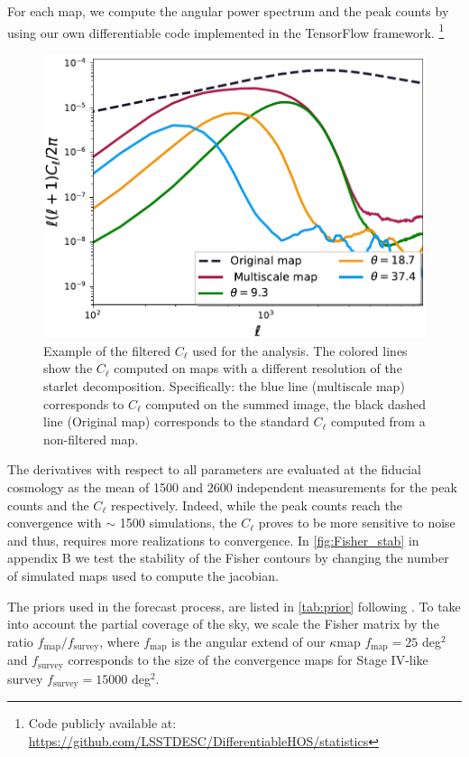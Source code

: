 \documentclass{aa}
\begin{document}
For each map, we compute the angular power spectrum and the peak counts by using our own differentiable code implemented in the TensorFlow framework. \footnote{
Code publicly available at: \\ \href{https://github.com/LSSTDESC/DifferentiableHOS/tree/main/DifferentiableHOS/statistics}{https://github.com/LSSTDESC/DifferentiableHOS/statistics}  }
\begin{figure}
    \centering
    \includegraphics[width=\columnwidth]{paper/figures/window.pdf}
    \caption{Example of the filtered $C_{\ell}$ used for the analysis. The colored lines show the $C_{\ell}$ computed on maps with a different resolution of the starlet decomposition. Specifically: the blue line (multiscale map) corresponds to $C_{\ell}$ computed on the summed image, the black dashed line (Original map) corresponds to the standard $C_{\ell}$ computed from a non-filtered map. }
     \label{fig:window}
\end{figure}



The derivatives with respect to all parameters are evaluated at the fiducial cosmology as the mean of 1500 and 2600 independent measurements for the peak counts and the $C_{\ell}$ respectively. Indeed, while the peak counts reach the convergence with $\sim$ 1500 simulations, the $C_{\ell}$ proves to be more sensitive to noise and thus, requires more realizations to convergence.
In \autoref{fig:Fisher_stab} in appendix B we test the stability of the Fisher contours by changing the number of simulated maps used to compute the jacobian.


The priors used in the forecast process, are listed in \autoref{tab:prior} following \citet{zhang2022transitioning}.
To take into account the partial coverage of the sky, we scale the Fisher matrix by the ratio $f_{\text{map}}/f_{\text{survey}}$, where $f_{\text{map}}$ is the angular extend of our $\kappa$map $f_{\text{map}}=25$ deg$^2$ and $f_{\text{survey}}$ corresponds to the size of the convergence maps for Stage IV-like survey $f_{\text{survey}}=15000$ deg$^2$.
\end{document}
